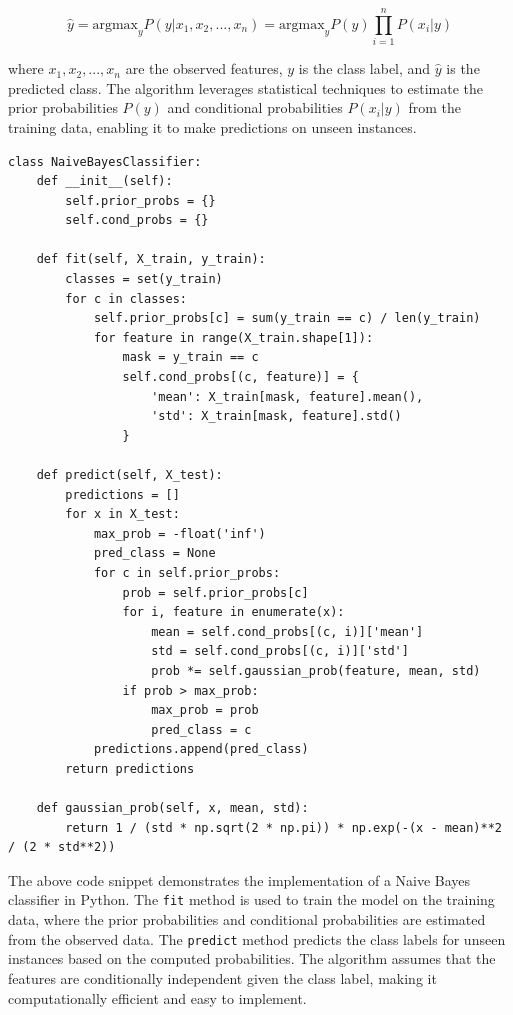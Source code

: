 \documentclass[12pt]{book} %
\begin{document}
\[
\hat{y} = \text{argmax}_y P(y | x_1, x_2, ..., x_n) = \text{argmax}_y P(y) \prod_{i=1}^{n} P(x_i | y)
\]

where \(x_1, x_2, ..., x_n\) are the observed features, \(y\) is the class label, and \(\hat{y}\) is the predicted class. The algorithm leverages statistical techniques to estimate the prior probabilities \(P(y)\) and conditional probabilities \(P(x_i | y)\) from the training data, enabling it to make predictions on unseen instances.

\FloatBarrier
\begin{lstlisting}
class NaiveBayesClassifier:
    def __init__(self):
        self.prior_probs = {}
        self.cond_probs = {}
    
    def fit(self, X_train, y_train):
        classes = set(y_train)
        for c in classes:
            self.prior_probs[c] = sum(y_train == c) / len(y_train)
            for feature in range(X_train.shape[1]):
                mask = y_train == c
                self.cond_probs[(c, feature)] = {
                    'mean': X_train[mask, feature].mean(),
                    'std': X_train[mask, feature].std()
                }
    
    def predict(self, X_test):
        predictions = []
        for x in X_test:
            max_prob = -float('inf')
            pred_class = None
            for c in self.prior_probs:
                prob = self.prior_probs[c]
                for i, feature in enumerate(x):
                    mean = self.cond_probs[(c, i)]['mean']
                    std = self.cond_probs[(c, i)]['std']
                    prob *= self.gaussian_prob(feature, mean, std)
                if prob > max_prob:
                    max_prob = prob
                    pred_class = c
            predictions.append(pred_class)
        return predictions
    
    def gaussian_prob(self, x, mean, std):
        return 1 / (std * np.sqrt(2 * np.pi)) * np.exp(-(x - mean)**2 / (2 * std**2))
\end{lstlisting}
\FloatBarrier

The above code snippet demonstrates the implementation of a Naive Bayes classifier in Python. The \texttt{fit} method is used to train the model on the training data, where the prior probabilities and conditional probabilities are estimated from the observed data. The \texttt{predict} method predicts the class labels for unseen instances based on the computed probabilities. The algorithm assumes that the features are conditionally independent given the class label, making it computationally efficient and easy to implement.
\end{document}
